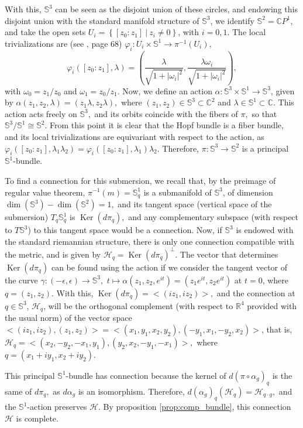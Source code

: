 \documentclass[12pt, letterpaper, reqno]{amsart}
\theoremstyle{definition}
\theoremstyle{plain}
\theoremstyle{remark}
\begin{document}
	With this, $ \mathbb{S}^3 $ can be seen as the disjoint union of these circles, and endowing this disjoint union with the standard manifold structure of $ \mathbb{S}^3 $, we identify $ \mathbb{S}^2 = \mathbb{C}P^1$, and take the open sets $ U_i= \left\{ \left[ z_0 : z_1 \right]\ | \ z_i\neq 0 \right\}$, with $ i=0,1. $ The local trivializations are (see \cite{luke2013vector}, page 68) $ \varphi_i: U_i \times \mathbb{S}^1 \rightarrow \pi^{-1}(U_i), $ $$ \varphi_i([z_0:z_1], \lambda) = \left( \frac{\lambda}{\sqrt{1+|\omega_i|^2}}, \frac{\lambda\omega_i}{\sqrt{1+|\omega_i|^2}}   \right), $$ with $ \omega_0=z_1/z_0 $ and $ \omega_1 = z_0/z_1. $ Now, we define an action $ \alpha: \mathbb{S}^3\times \mathbb{S}^1 \rightarrow { \mathbb{S}^3}
	$, given by $ \alpha(z_1,z_2,\lambda) = (z_1\lambda, z_2\lambda), $ where $ (z_1,z_2)\in \mathbb{S}^3\subset \mathbb{C}^2 $ and $ \lambda\in \mathbb{S}^1 \subset \mathbb{C}. $ This action acts freely on $ \mathbb{S}^3, $ and its orbits coincide with the fibers of $ \pi, $ so that $ \mathbb{S}^3/ \mathbb{S}^1 \cong \mathbb{S}^2. $ From this point it is clear that the Hopf bundle is a fiber bundle, and its local trivializations are equivariant with respect to the action, as $ \varphi_i([z_0:z_1], \lambda_1\lambda_2) = \varphi_i([z_0:z_1], \lambda_1)\lambda_2. $ Therefore, $ \pi: \mathbb{S}^3 \rightarrow { \mathbb{S}^2} $ is a principal $ \mathbb{S}^1$-bundle.

	To find a connection for this submersion, we recall that, by the preimage of regular value theorem, $ \pi^{-1}(m) = \mathbb{S}^1_q $ is a submanifold of $ \mathbb{S}^3 $, of dimension $ \operatorname{dim}( \mathbb{S}^3)- \operatorname{dim}( \mathbb{S}^2) = 1,  $ and its tangent space (vertical space of the submersion) $ T_q \mathbb{S}^1_q $ is $ \operatorname{Ker}(d\pi_q),  $ and any complementary subspace (with respect to $ T \mathbb{S}^3 $)  to this tangent space would be a connection. Now, if $ \mathbb{S}^3 $ is endowed with the standard riemannian structure, there is only one connection compatible with the metric, and is given by $ \mathcal{H}_q = \operatorname{Ker}(d\pi_q)^\perp. $ The vector that determines $ \operatorname{Ker}(d\pi_q)  $ can be found using the action if we consider the tangent vector of the curve $ \gamma: (-\epsilon, \epsilon) \rightarrow \mathbb{S}^3, $ $ t\mapsto \alpha(z_1,z_2, e^{it})=(z_1e^{it},z_2e^{it}) $ at $ t=0 $, where $ q=(z_1,z_2). $ With this, $ \operatorname{Ker}(d\pi_q) = <(iz_1, iz_2)>,  $ and the connection at $ q\in \mathbb{S}^3 $,  $ \mathcal{H}_q $, will be the orthogonal complement (with respect to $ \mathbb{R}^4 $ provided with the usual norm) of the vector space $ <(iz_1,iz_2), (z_1,z_2)>  {= <(x_1,y_1,x_2,y_2), (-y_1,x_1,-y_2,x_2)>}$, that is, $ \mathcal{H}_q = <(x_2,-y_2,-x_1,y_1),(y_2,x_2,-y_1,-x_1)>, $ where $ q=(x_1+iy_1, x_2+iy_2). $   

	This principal $ \mathbb{S}^1$-bundle has connection because the kernel of $ d(\pi\circ \alpha_g)_q $ is the same of $ d\pi_q, $ as $ d\alpha_g $ is an isomorphism. Therefore, $ d(\alpha_g)_q ( \mathcal{H}_q) = \mathcal{H}_{q\cdot g}, $ and the $ \mathbb{S}^1 $-action preserves $ \mathcal{H}. $ By proposition \ref{prop:comp_bundle}, this connection $ \mathcal{H} $ is complete.  
 

\nocite{*}

\end{document}

